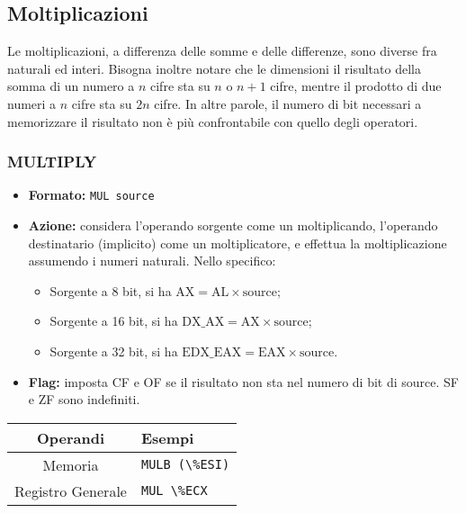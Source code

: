 \documentclass[a4paper,11pt]{article}
\begin{document}
\subsection{Moltiplicazioni}
Le moltiplicazioni, a differenza delle somme e delle differenze, sono diverse fra naturali ed interi.
Bisogna inoltre notare che le dimensioni il risultato della somma di un numero a $n$ cifre sta su $n$ o $n+1$ cifre, mentre il prodotto di due numeri a $n$ cifre sta su $2n$ cifre.
In altre parole, il numero di bit necessari a memorizzare il risultato non è più confrontabile con quello degli operatori.


\subsubsection{MULTIPLY}
\begin{itemize}
	\item \textbf{Formato:} \lstinline|MUL source|
	\item \textbf{Azione:} considera l'operando sorgente come un moltiplicando, l'operando destinatario (implicito) come un moltiplicatore, e effettua la moltiplicazione assumendo i numeri naturali. Nello specifico:
	\begin{itemize}
		\item Sorgente a 8 bit, si ha $\text{AX} = \text{AL} \times \text{source}$;
		\item Sorgente a 16 bit, si ha $\text{DX}\_\text{AX} = \text{AX} \times \text{source}$;
		\item Sorgente a 32 bit, si ha $\text{EDX}\_\text{EAX} = \text{EAX} \times \text{source}$.
	\end{itemize}
	\item \textbf{Flag:} imposta CF e OF se il risultato non sta nel numero di bit di source. SF e ZF sono indefiniti.
\end{itemize}

		\begin{table}[H]
		\center {}
			\begin{tabular} { c | p{5cm} }
				\bfseries Operandi & \bfseries Esempi \\
				\hline
				Memoria & \lstinline|MULB (\%ESI)| \\ 
				Registro Generale & \lstinline|MUL \%ECX|
			\end{tabular}
		\end{table}
\end{document}
